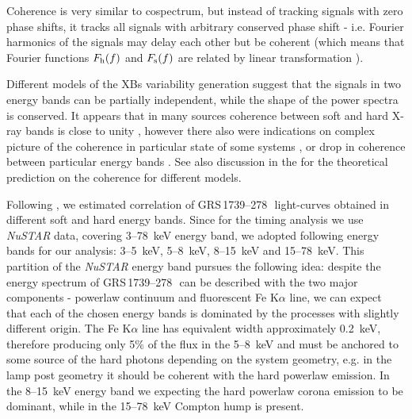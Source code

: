 \documentclass[a4paper,fleqn,usenatbib]{mnras}
\def\grs{{GRS\,1739--278\,}}
\begin{document}
Coherence is very similar to cospectrum, but instead of tracking signals with zero phase shifts, it tracks all signals with arbitrary conserved phase shift - i.e. Fourier harmonics of the signals may delay each other but be coherent (which means that Fourier functions $F_{\rm h}(f)$ and $F_{\rm s}(f)$ are related by linear transformation \citep{1997ApJ...474L..43V}).

Different models of the XBs variability generation suggest that the signals in two energy bands can be partially independent, while the shape of the power spectra is conserved.
It appears that in many sources coherence between soft and hard X-ray bands is close to unity \citep{1999ApJ...517..355N, wijnands99}, however there also were indications on complex picture of the coherence in particular state of some systems \citep{2003ApJ...584L..23J}, or drop in coherence between particular energy bands \citep[e.g. in GX 339--4][]{1997ApJ...474L..43V}.
See also discussion in the \citet{1997ApJ...474L..43V} for the theoretical prediction on the coherence for different models.


Following \citet{1997ApJ...474L..43V}, we estimated correlation of \grs\ light-curves obtained in different soft and hard energy bands. 
Since for the timing analysis we use {\it NuSTAR} data, covering 3--78~keV energy band, we adopted following energy bands for our analysis: 3--5~keV, 5--8~keV, 8--15~keV and 15--78~keV.
This partition of the {\it NuSTAR} energy band pursues the following idea: despite the energy spectrum of \grs\ can be described with the two major components - powerlaw continuum and fluorescent Fe K$\alpha$ line, we can expect that each of the chosen energy bands is dominated by the processes with slightly different origin. 
The Fe K$\alpha$ line has equivalent width approximately 0.2~keV, therefore producing only 5\% of the flux in the 5--8~keV and must be anchored to some source of the hard photons depending on the system geometry, e.g. in the lamp post geometry it should be coherent with the hard powerlaw emission. 
In the 8--15~keV energy band we expecting the hard powerlaw corona emission to be dominant, while in the 15--78~keV Compton hump is present.
\end{document}
